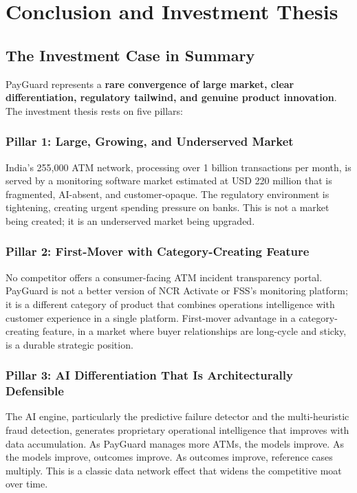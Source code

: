 \documentclass[12pt,a4paper]{article}
\begin{document}
\newpage

\section{Conclusion and Investment Thesis}

\subsection{The Investment Case in Summary}

PayGuard represents a \textbf{rare convergence of large market, clear differentiation,
regulatory tailwind, and genuine product innovation}. The investment thesis rests on five
pillars:

\subsubsection{Pillar 1: Large, Growing, and Underserved Market}

India's 255,000 ATM network, processing over 1 billion transactions per month, is served by
a monitoring software market estimated at USD 220 million that is fragmented, AI-absent, and
customer-opaque. The regulatory environment is tightening, creating urgent spending pressure
on banks. This is not a market being created; it is an underserved market being upgraded.

\subsubsection{Pillar 2: First-Mover with Category-Creating Feature}

No competitor offers a consumer-facing ATM incident transparency portal. PayGuard is not a
better version of NCR Activate or FSS's monitoring platform; it is a different category of
product that combines operations intelligence with customer experience in a single platform.
First-mover advantage in a category-creating feature, in a market where buyer relationships
are long-cycle and sticky, is a durable strategic position.

\subsubsection{Pillar 3: AI Differentiation That Is Architecturally Defensible}

The AI engine, particularly the predictive failure detector and the multi-heuristic fraud
detection, generates proprietary operational intelligence that improves with data accumulation.
As PayGuard manages more ATMs, the models improve. As the models improve, outcomes improve.
As outcomes improve, reference cases multiply. This is a classic data network effect that
widens the competitive moat over time.
\end{document}
